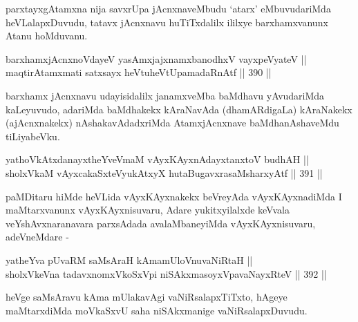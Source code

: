 \begin{artha}
parxtayxgAtamxna nija savxrUpa jAcnxnaveMbudu `atarx' eMbuvudariMda
heVLalapxDuvudu, tatavx jAcnxnavu huTiTxdalilx ililxye barxhamxvanunx
Atanu hoMduvanu.
\end{artha}


\begin{shl}
barxhamxjAcnxnoVdayeV yasAmxjajxnamxbanodhxV vayxpeVyateV ||  \\
maqtirAtamxmati \footnotemark[1]satxsayx heVtuheVtUpamadaRnAtf \hfill || 390 ||  
\end{shl}

\begin{artha}
barxhamx jAcnxnavu udayisidalilx janamxveMba baMdhavu yAvudariMda
kaLeyuvudo, adariMda baMdhakekx kAraNavAda (dhamARdigaLa) kAraNakekx
(ajAcnxnakekx) nAshakavAdadxriMda AtamxjAcnxnave baMdhanAshaveMdu
tiLiyabeVku.
\end{artha}


\begin{shl}
yathoVkAtxdanayxtheYveVmaM vAyxKAyxnAdayxtanxtoV budhAH ||  \\
sholxVkaM vAyxcakaSxteV\s yukAtxyX hutaBugavxrasaMsharxyAtf \hfill || 391 ||  
\end{shl}

\begin{artha}
paMDitaru hiMde heVLida vAyxKAyxnakekx beVreyAda vAyxKAyxnadiMda I
maMtarxvanunx vAyxKAyxnisuvaru, Adare yukitxyilalxde keVvala
veYshAvxnaranavara parxsAdada avalaMbaneyiMda vAyxKAyxnisuvaru, adeVneMdare  -
\end{artha}

\begin{shl}
yatheYva pUvaRM saMsAraH kAmamUloV\s nuvaNiRtaH || \\
sholxVkeVna tadavxnomxVkoSxV\s pi niSAkxmasoyxVpavaNayxRteV \hfill || 392 ||  
\end{shl}

\begin{artha}
heVge saMsAravu kAma mUlakavAgi vaNiRsalapxTiTxto, hAgeye maMtarxdiMda
moVkaSxvU saha niSAkxmanige vaNiRsalapxDuvudu.
\end{artha}

